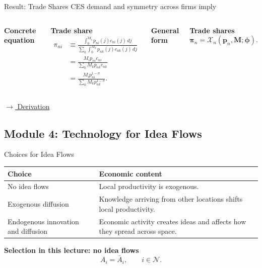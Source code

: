 \documentclass[aspectratio=169,11pt]{beamer}
\newcommand{\B}[1]{\textcolor{blue1}{\textbf{#1}}}
\newcommand{\derivlink}[1]{%
  \hyperlink{#1}{\textcolor{blue1}{\footnotesize
  \(\longrightarrow\) Derivation}}}
\begin{document}
\begin{frame}[t,label=mainTradeShares]{Result: Trade Shares}
  \small
  CES demand and symmetry across firms imply
  \begin{columns}[T,onlytextwidth]
      \B{Concrete equation}

      \B{Trade share}
      \[
        \begin{aligned}
          \pi_{ni}
          &\equiv
          \frac{
            \displaystyle\int_0^{M_i}p_{ni}(j)c_{ni}(j)\,dj
          }{
            \displaystyle\sum_k\int_0^{M_k}p_{nk}(j)c_{nk}(j)\,dj
          }
          \\[3pt]
          &=
          \frac{M_ip_{ni}c_{ni}}
               {\sum_kM_kp_{nk}c_{nk}}
          \\[3pt]
          &=
          \frac{M_ip_{ni}^{1-\sigma}}
               {\sum_kM_kp_{nk}^{1-\sigma}}
          .
        \end{aligned}
      \]

      \B{General form}

      \B{Trade shares}
      \[
        \boldsymbol\pi_n
        =
        \mathcal X_n(\mathbf p_n,\mathbf M;\boldsymbol\phi).
      \]
  \end{columns}

  \smallskip
  \hfill\derivlink{appTrade}
\end{frame}

\subsection{Module 4: Technology for Idea Flows}

\begin{frame}{Choices for Idea Flows}
  \renewcommand{\arraystretch}{1.25}
  \begin{tabular}{
    >{\raggedright\arraybackslash}p{}
    >{\raggedright\arraybackslash}p{}}
    \toprule
    Choice & Economic content \\
    \midrule
    No idea flows
      & Local productivity is exogenous. \\
    Exogenous diffusion
      & Knowledge arriving from other locations shifts local productivity. \\
    Endogenous innovation and diffusion
      & Economic activity creates ideas and affects how they spread across space. \\
    \bottomrule
  \end{tabular}

  \vfill
  \B{Selection in this lecture: no idea flows}
  \[
    A_i=\bar A_i,
    \qquad i\in\mathcal N.
  \]
\end{frame}
\end{document}
